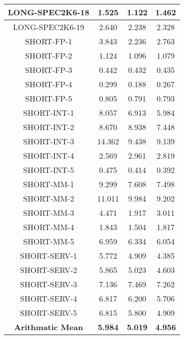 \documentclass[paper=letter, fontsize=12pt]{article}
\begin{document}
\begin{table}[!h]
\begin{center}
\begin{tabular}{| c | c | c | c |}
LONG-SPEC2K6-18     &        1.525  &       1.122   &       1.462 \\ \hline   
LONG-SPEC2K6-19     &        2.640  &       2.238   &       2.328 \\ \hline   
SHORT-FP-1          &        3.843  &       2.236   &       2.763 \\ \hline   
SHORT-FP-2          &        1.124  &       1.096   &       1.079 \\ \hline   
SHORT-FP-3          &        0.442  &       0.432   &       0.435 \\ \hline   
SHORT-FP-4          &        0.299  &       0.188   &       0.267 \\ \hline   
SHORT-FP-5          &        0.805  &       0.791   &       0.793 \\ \hline   
SHORT-INT-1         &        8.057  &       6.913   &       5.984 \\ \hline   
SHORT-INT-2         &        8.670  &       8.938   &       7.448 \\ \hline   
SHORT-INT-3         &       14.362  &       9.438   &       9.139 \\ \hline   
SHORT-INT-4         &        2.569  &       2.961   &       2.819 \\ \hline   
SHORT-INT-5         &        0.475  &       0.414   &       0.392 \\ \hline   
SHORT-MM-1          &        9.299  &       7.608   &       7.498 \\ \hline   
SHORT-MM-2          &       11.011  &       9.984   &       9.202 \\ \hline   
SHORT-MM-3          &        4.471  &       1.917   &       3.011 \\ \hline   
SHORT-MM-4          &        1.843  &       1.504   &       1.817 \\ \hline   
SHORT-MM-5          &        6.959  &       6.334   &       6.054 \\ \hline   
SHORT-SERV-1        &        5.772  &       4.909   &       4.385 \\ \hline   
SHORT-SERV-2        &        5.865  &       5.023   &       4.603 \\ \hline   
SHORT-SERV-3        &        7.136  &       7.469   &       7.262 \\ \hline   
SHORT-SERV-4        &        6.817  &       6.200   &       5.706 \\ \hline   
SHORT-SERV-5        &        6.815  &       5.800   &       4.909 \\ \hline   
\textbf{Arithmatic Mean}     &        \textbf{5.984}  &       \textbf{5.019}   &       \textbf{4.956} \\ \hline   

\end{tabular}
\end{center}
\end{table}
\end{document}
